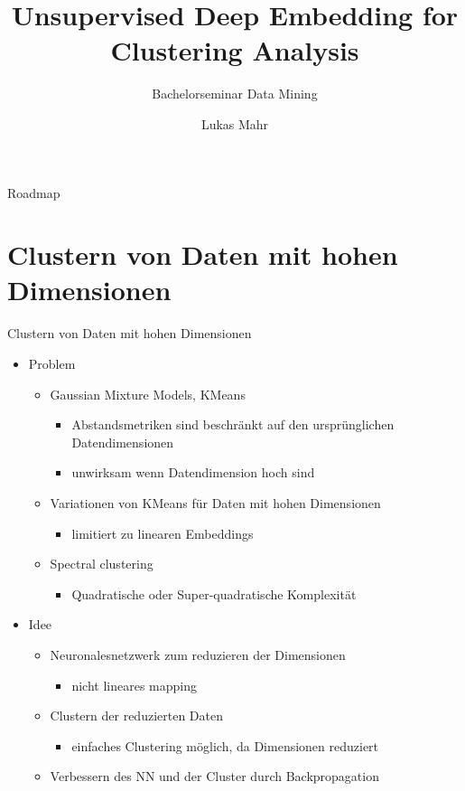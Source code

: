 \documentclass{beamer}
\title{Unsupervised Deep Embedding for Clustering Analysis}
\subtitle{Bachelorseminar Data Mining}
\author{Lukas Mahr}
\institute{Ludwig-Maximilians-Universität München}
\date{}
\begin{document}
\begin{frame}
\titlepage
\end{frame}


\begin{frame}[plain]{Roadmap}
\tableofcontents[hideallsubsections]
\end{frame}

\section{Clustern von Daten mit hohen Dimensionen}
\begin{frame}[t]{Clustern von Daten mit hohen Dimensionen}\vspace{4pt}
\begin{itemize}
\item Problem
\begin{itemize}
\item Gaussian Mixture Models, KMeans
\begin{itemize}
\item Abstandsmetriken sind beschränkt auf den ursprünglichen Datendimensionen
\item unwirksam wenn Datendimension hoch sind\cite{steinbach}
\end{itemize}
\item Variationen von KMeans für Daten mit hohen Dimensionen
\begin{itemize}
\item limitiert zu linearen Embeddings\cite{ye}
\end{itemize}
\item Spectral clustering
\begin{itemize}
\item Quadratische oder Super-quadratische Komplexität
\end{itemize}
\end{itemize}
\item Idee
\begin{itemize}
\item Neuronalesnetzwerk zum reduzieren der Dimensionen
\begin{itemize}
\item nicht lineares mapping
\end{itemize}
\item Clustern der reduzierten Daten
\begin{itemize}
\item einfaches Clustering möglich, da Dimensionen reduziert
\end{itemize}
\item Verbessern des NN und der Cluster durch Backpropagation
\end{itemize}
\end{itemize}

\end{frame}
\end{document}
